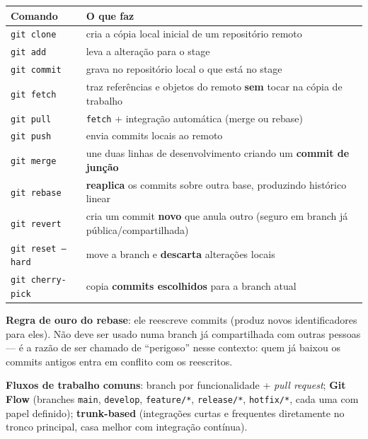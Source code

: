 \begin{conceito}
\begin{center}
\begin{tabular}{@{}p{2.8cm}p{8.4cm}@{}}
\toprule
\textbf{Comando} & \textbf{O que faz} \\
\midrule
\texttt{git clone} & cria a cópia local inicial de um repositório remoto \\
\texttt{git add} & leva a alteração para o stage \\
\texttt{git commit} & grava no repositório local o que está no stage \\
\texttt{git fetch} & traz referências e objetos do remoto \textbf{sem}
tocar na cópia de trabalho \\
\texttt{git pull} & \texttt{fetch} + integração automática (merge ou
rebase) \\
\texttt{git push} & envia commits locais ao remoto \\
\texttt{git merge} & une duas linhas de desenvolvimento criando um
\textbf{commit de junção} \\
\texttt{git rebase} & \textbf{reaplica} os commits sobre outra base,
produzindo histórico linear \\
\texttt{git revert} & cria um commit \textbf{novo} que anula outro
(seguro em branch já pública/compartilhada) \\
\texttt{git reset --hard} & move a branch e \textbf{descarta} alterações
locais \\
\texttt{git cherry-pick} & copia \textbf{commits escolhidos} para a
branch atual \\
\bottomrule
\end{tabular}
\end{center}

\textbf{Regra de ouro do rebase}: ele reescreve commits (produz novos
identificadores para eles). Não deve ser usado numa branch já
compartilhada com outras pessoas --- é a razão de ser chamado de
“perigoso” nesse contexto: quem já baixou os commits antigos entra em
conflito com os reescritos.

\textbf{Fluxos de trabalho comuns}: branch por funcionalidade + \textit{pull
request}; \textbf{Git Flow} (branches \texttt{main}, \texttt{develop},
\texttt{feature/*}, \texttt{release/*}, \texttt{hotfix/*}, cada uma com
papel definido); \textbf{trunk-based} (integrações curtas e frequentes
diretamente no tronco principal, casa melhor com integração contínua).
\end{conceito}

